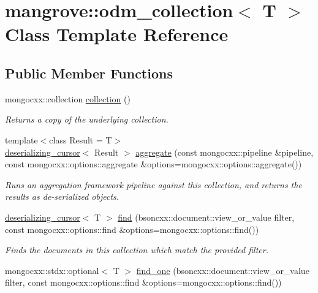 \hypertarget{classmangrove_1_1odm__collection}{}\section{mangrove\+:\+:odm\+\_\+collection$<$ T $>$ Class Template Reference}
\label{classmangrove_1_1odm__collection}
\subsection*{Public Member Functions}
\begin{DoxyCompactItemize}
\item 
mongocxx\+::collection \hyperlink{classmangrove_1_1odm__collection_a254205ee428e7884fd6f6cfd1265a083}{collection} ()
\begin{DoxyCompactList}\small\item\em Returns a copy of the underlying collection. \end{DoxyCompactList}\item 
{\footnotesize template$<$class Result  = T$>$ }\\\hyperlink{classmangrove_1_1deserializing__cursor}{deserializing\+\_\+cursor}$<$ Result $>$ \hyperlink{classmangrove_1_1odm__collection_aad9103bc25239b287fc2ca074bc60c9d}{aggregate} (const mongocxx\+::pipeline \&pipeline, const mongocxx\+::options\+::aggregate \&options=mongocxx\+::options\+::aggregate())
\begin{DoxyCompactList}\small\item\em Runs an aggregation framework pipeline against this collection, and returns the results as de-\/serialized objects. \end{DoxyCompactList}\item 
\hyperlink{classmangrove_1_1deserializing__cursor}{deserializing\+\_\+cursor}$<$ T $>$ \hyperlink{classmangrove_1_1odm__collection_aa1ed71ad6b4238f101f693c019860da7}{find} (bsoncxx\+::document\+::view\+\_\+or\+\_\+value filter, const mongocxx\+::options\+::find \&options=mongocxx\+::options\+::find())
\begin{DoxyCompactList}\small\item\em Finds the documents in this collection which match the provided filter. \end{DoxyCompactList}\item 
mongocxx\+::stdx\+::optional$<$ T $>$ \hyperlink{classmangrove_1_1odm__collection_a4581d5fae3e1f6516948d0a4bfd872dc}{find\+\_\+one} (bsoncxx\+::document\+::view\+\_\+or\+\_\+value filter, const mongocxx\+::options\+::find \&options=mongocxx\+::options\+::find())

\end{DoxyCompactItemize}
